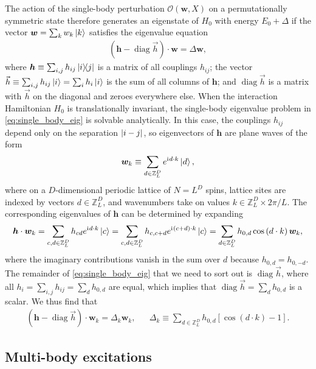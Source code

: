 \documentclass[nofootinbib,notitlepage,11pt]{revtex4-2}
\newcommand{\p}[1]{\left(#1\right)} %
\renewcommand{\sp}[1]{\left[#1\right]} %
\renewcommand{\c}{\cdot} %
\newcommand{\m}{\bm} %
\renewcommand{\v}{\vec} %
\newcommand{\1}{\mathds{1}}
\renewcommand{\i}{\mathrm{i}\mkern1mu}
\renewcommand{\O}{\mathcal{O}}
\newcommand{\ZZ}{\mathbb{Z}}
\newcommand{\oper}{\operatorname}
\begin{document}
The action of the single-body perturbation $\O\p{\m w,X}$ on a
permutationally symmetric state therefore generates an eigenstate of
$H_0$ with energy $E_0+\Delta$ if the vector $\m w=\sum_k w_k \ket{k}$
satisfies the eigenvalue equation
\begin{align}
  \p{\m h - \oper{diag}\v h} \c \m w = \Delta \m w,
  \label{eq:single_body_eig}
\end{align}
where $\m h\equiv\sum_{i,j} h_{ij} \op{i}{j}$ is a matrix of all
couplings $h_{ij}$; the vector
$\v h \equiv \sum_{i,j} h_{ij} \ket{i} = \sum_i h_i \ket{i}$ is the
sum of all columns of $\m h$; and $\oper{diag}\v h$ is a matrix with $\v h$
on the diagonal and zeroes everywhere else.  When the interaction
Hamiltonian $H_0$ is translationally invariant, the single-body
eigenvalue problem in \eqref{eq:single_body_eig} is solvable
analytically.  In this case, the couplings $h_{ij}$ depend only on the
separation $\abs{i-j}$, so eigenvectors of $\m h$ are plane waves of
the form
\begin{align}
  \m w_k \equiv \sum_{d\in\ZZ_L^D} e^{\i d\c k} \ket{d},
\end{align}
where on a $D$-dimensional periodic lattice of $N=L^D$ spins, lattice
sites are indexed by vectors $d\in\ZZ_L^D$, and wavenumbers take on
values $k\in\ZZ_L^D\times2\pi/L$.  The corresponding eigenvalues of
$\m h$ can be determined by expanding
\begin{align}
  \m h \c \m w_k
  = \sum_{c,d\in\ZZ_L^D} h_{cd} e^{\i d\c k} \ket{c}
  = \sum_{c,d\in\ZZ_L^D} h_{c,c+d} e^{\i\p{c+d}\c k} \ket{c}
  = \sum_{d\in\ZZ_L^D} h_{0,d} \cos\p{d\c k} \m w_k,
\end{align}
where the imaginary contributions vanish in the sum over $d$ because
$h_{0,d}=h_{0,-d}$.  The remainder of \eqref{eq:single_body_eig} that
we need to sort out is $\oper{diag}\v h$, where all
$h_i = \sum_{i,j}h_{ij} = \sum_d h_{0,d}$ are equal, which implies
that $\oper{diag}\v h = \sum_d h_{0,d}$ is a scalar.  We thus find that
\begin{align}
  \p{\m h - \oper{diag}\v h} \c \m w_k = \Delta_k \m w_k,
  &&
  \Delta_k \equiv \sum_{d\in\ZZ_L^D} h_{0,d} \sp{\cos\p{d\c k}-1}.
\end{align}

\subsection{Multi-body excitations}
\end{document}
